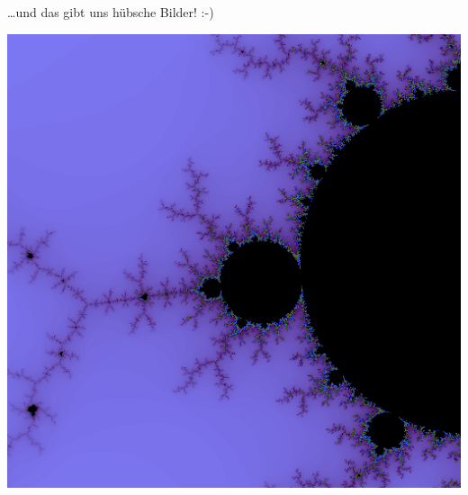 \documentclass{beamer}
\begin{document}

\begin{frame}

\dots und das gibt uns hübsche Bilder! :-)\smallskip

\begin{center}
\includegraphics[scale=0.65]{mandelbrot.png} 
\end{center}

\end{frame}
\end{document}
